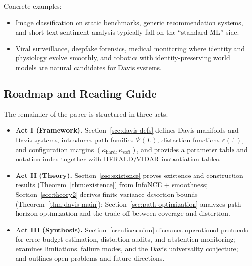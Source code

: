 \documentclass[11pt]{article}
\begin{document}
Concrete examples:
\begin{itemize}[leftmargin=*]
    \item Image classification on static benchmarks, generic recommendation systems, and short-text sentiment analysis typically fall on the ``standard ML'' side.
    \item Viral surveillance, deepfake forensics, medical monitoring where identity and physiology evolve smoothly, and robotics with identity-preserving world models are natural candidates for Davis systems.
\end{itemize}

\subsection{Roadmap and Reading Guide}
\label{sec:roadmap}

The remainder of the paper is structured in three acts.

\begin{itemize}[leftmargin=*]
    \item \textbf{Act I (Framework).} Section~\ref{sec:davis-defs} defines 
    Davis manifolds and Davis systems, introduces path families $\mathcal{P}(L)$, 
    distortion functions $\varepsilon(L)$, and configuration margins 
    $(\kappa_{\mathrm{hard}}, \kappa_{\mathrm{soft}})$, and provides a 
    parameter table and notation index together with HERALD/VIDAR instantiation 
    tables.
    
    \item \textbf{Act II (Theory).} Section~\ref{sec:existence} proves existence 
    and construction results (Theorem~\ref{thm:existence}) from InfoNCE + smoothness; 
    Section~\ref{sec:theory2} derives finite-variance detection bounds 
    (Theorem~\ref{thm:davis-main}); Section~\ref{sec:path-optimization} 
    analyzes path-horizon optimization and the trade-off between coverage and 
    distortion.
    
    \item \textbf{Act III (Synthesis).} Section~\ref{sec:discussion} discusses 
    operational protocols for error-budget estimation, distortion audits, and 
    abstention monitoring; examines limitations, failure modes, and the Davis 
    universality conjecture; and outlines open problems and future directions.
\end{itemize}
\end{document}

